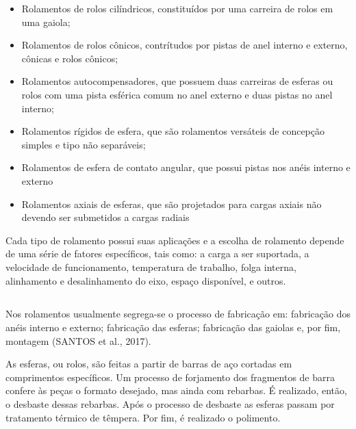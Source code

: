 \documentclass[
	12pt,				
	oneside,			
	a4paper,			
	english,			
	brazil,			
	]{abntex2ppgsi}
\begin{document}
\begin{itemize}
	\item Rolamentos de rolos cilíndricos, constituídos por uma carreira de rolos em uma gaiola;
	\item Rolamentos de rolos cônicos, contrítudos por pistas de anel interno e externo, cônicas e rolos cônicos;
	\item Rolamentos autocompensadores, que possuem duas carreiras de esferas ou rolos com uma pista esférica comum no anel externo e duas pistas no anel interno;
	\item Rolamentos rígidos de esfera, que são rolamentos versáteis de concepção simples e tipo não separáveis;
	\item Rolamentos de esfera de contato angular, que possui pistas nos anéis interno e externo
	\item Rolamentos axiais de esferas, que são projetados para cargas axiais não devendo ser submetidos a cargas radiais
\end{itemize}

Cada tipo de rolamento possui suas aplicações e a escolha de rolamento depende de uma série de fatores específicos, tais como: a carga a ser suportada, a velocidade de funcionamento, temperatura de trabalho, folga interna, alinhamento e desalinhamento do eixo, espaço disponível, e outros. 

\subsection{}

Nos rolamentos usualmente segrega-se o processo de fabricação em: fabricação dos anéis interno e externo; fabricação das esferas; fabricação das gaiolas e, por fim, montagem (SANTOS et al., 2017).   

As esferas, ou rolos, são feitas a partir de barras de aço cortadas em comprimentos específicos. Um processo de forjamento dos fragmentos de barra confere às peças o formato desejado, mas ainda com rebarbas. É realizado, então, o desbaste dessas rebarbas. Após o processo de desbaste as esferas passam por tratamento térmico de têmpera. Por fim, é realizado o polimento. 
\end{document}
